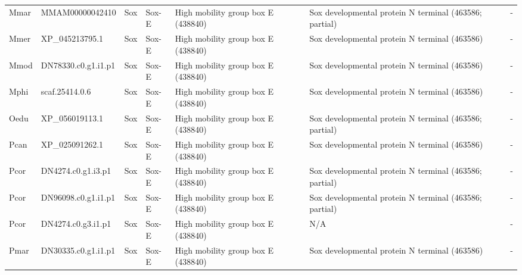 \documentclass[../main.tex]{subfiles}
\begin{document}
\begin{landscape}
\begin{longtable}{lllllll}
		Mmar           & MMAM00000042410       & Sox            & Sox-E               & High mobility group box E (438840)          & Sox developmental protein N terminal (463586; partial)                 & -                    \\
		Mmer           & XP\_045213795.1       & Sox            & Sox-E               & High mobility group box E (438840)          & Sox developmental protein N terminal (463586)                          & -                    \\
		Mmod           & DN78330.c0.g1.i1.p1   & Sox            & Sox-E               & High mobility group box E (438840)          & Sox developmental protein N terminal (463586)                          & -                    \\
		Mphi           & scaf.25414.0.6        & Sox            & Sox-E               & High mobility group box E (438840)          & Sox developmental protein N terminal (463586)                          & -                    \\
		Oedu           & XP\_056019113.1       & Sox            & Sox-E               & High mobility group box E (438840)          & Sox developmental protein N terminal (463586; partial)                 & -                    \\
		Pcan           & XP\_025091262.1       & Sox            & Sox-E               & High mobility group box E (438840)          & Sox developmental protein N terminal (463586)                          & -                    \\
		Pcor           & DN4274.c0.g1.i3.p1    & Sox            & Sox-E               & High mobility group box E (438840)          & Sox developmental protein N terminal (463586; partial)                 & -                    \\
		Pcor           & DN96098.c0.g1.i1.p1   & Sox            & Sox-E               & High mobility group box E (438840)          & Sox developmental protein N terminal (463586; partial)                 & -                    \\
		Pcor           & DN4274.c0.g3.i1.p1    & Sox            & Sox-E               & High mobility group box E (438840)          & N/A                                                                    & -                    \\
		Pmar           & DN30335.c0.g1.i1.p1   & Sox            & Sox-E               & High mobility group box E (438840)          & Sox developmental protein N terminal (463586)                          & -                    \\

\end{longtable}
\end{landscape}
\end{document}
